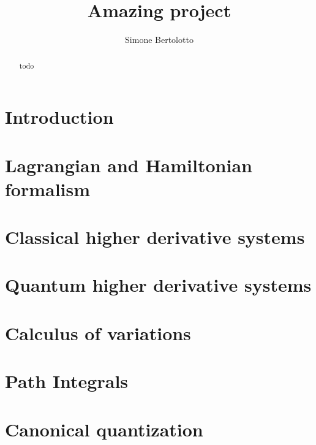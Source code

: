 \documentclass[a4paper]{article}
\title{Amazing project}
\author{Simone Bertolotto}
\theoremstyle{definition}
\numberwithin{equation}{section}
\begin{document}
  \maketitle

  \begin{abstract}
    todo
  \end{abstract}

  \newpage

  \section{Introduction}\label{section: introduction}
  

  \section{Lagrangian and Hamiltonian formalism}\label{section: lagrangin and
  hamiltonian formalism}
  

  \section{Classical higher derivative systems}\label{section: classical higher
  derivative systems}
  

  \section{Quantum higher derivative systems}\label{section: quantum higher
  derivative systems}
  

  \newpage

  \begin{appendices}
    \section{Calculus of variations}\label{appendix: calculus of variation}
    

    \section{Path Integrals}\label{appendix:path_integrals}
    

    \section{Canonical quantization}\label{appendix:canonical_quantization}
    
  \end{appendices}

  \newpage

  \printbibliography{}
\end{document}
